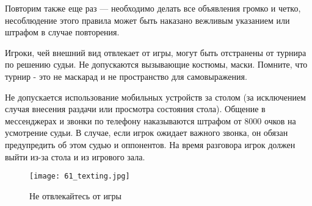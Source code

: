 Повторим также еще раз --- необходимо делать все объявления громко и четко, несоблюдение этого правила может быть наказано вежливым указанием или штрафом в случае повторения.

Игроки, чей внешний вид отвлекает от игры, могут быть отстранены от турнира по решению судьи. Не допускаются вызывающие костюмы, маски. Помните, что турнир - это не маскарад и не пространство для самовыражения.

Не допускается использование мобильных устройств за столом (за исключением случая внесения раздачи или просмотра состояния стола). Общение в мессенджерах и звонки по телефону наказываются штрафом от 8000 очков на усмотрение судьи. В случае, если игрок ожидает важного звонка, он обязан предупредить об этом судью и оппонентов. На время разговора игрок должен выйти из-за стола и из игрового зала.

\begin{figure}[H]
	\centering
	\texttt{[image: 61\_texting.jpg]}
	\caption{Не отвлекайтесь от игры}
\end{figure}
